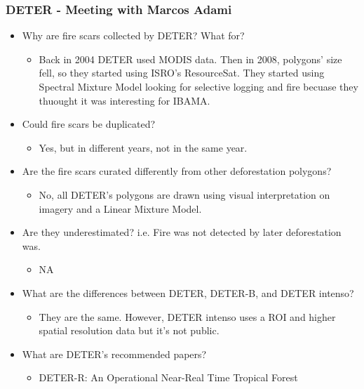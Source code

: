 \documentclass{beamer}
\begin{document}
\begin{frame}[t, allowframebreaks]
    \frametitle{DETER - Meeting with Marcos Adami}
    \begin{itemize}
        \item Why are fire scars collected by DETER? What for?
        \begin{itemize}
            \item Back in 2004 DETER used MODIS data. Then in 2008, polygons' 
                size fell, so they started using ISRO's ResourceSat. They 
                started using Spectral Mixture Model looking for selective 
                logging and fire becuase they thuought it was interesting for
                IBAMA.
        \end{itemize}
        \item Could fire scars be duplicated? 
        \begin{itemize}
            \item Yes, but in different years, not in the same year.
        \end{itemize}
        \item Are the fire scars curated differently from other deforestation 
            polygons?
        \begin{itemize}
            \item No, all DETER's polygons are drawn using visual 
                interpretation on imagery and a Linear Mixture Model.
        \end{itemize}
        \item Are they underestimated? i.e. Fire was not detected by later 
            deforestation was.
        \begin{itemize}
            \item NA
        \end{itemize}
        \item What are the differences between DETER, DETER-B, and DETER 
            intenso?
        \begin{itemize}
            \item They are the same. However, DETER intenso uses a ROI and 
                higher spatial resolution data but it's not public.
        \end{itemize}
        \item What are DETER's recommended papers?
        \begin{itemize}
            \item DETER-R: An Operational Near-Real Time Tropical Forest 

\end{itemize}
\end{itemize}
\end{frame}
\end{document}
